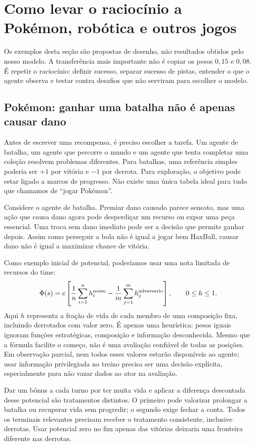 \documentclass[11pt,a4paper]{article}
\begin{document}
\section{Como levar o raciocínio a Pokémon, robótica e outros jogos}
Os exemplos desta seção são propostas de desenho, não resultados obtidos pelo nosso modelo. A transferência mais importante não é copiar os pesos $0{,}15$ e $0{,}08$. É repetir o raciocínio: definir sucesso, separar sucesso de pistas, entender o que o agente observa e testar contra desafios que não serviram para escolher o modelo.

\subsection{Pokémon: ganhar uma batalha não é apenas causar dano}
Antes de escrever uma recompensa, é preciso escolher a tarefa. Um agente de batalha, um agente que percorre o mundo e um agente que tenta completar uma coleção resolvem problemas diferentes. Para batalhas, uma referência simples poderia ser $+1$ por vitória e $-1$ por derrota. Para exploração, o objetivo pode estar ligado a marcos de progresso. Não existe uma única tabela ideal para tudo que chamamos de ``jogar Pokémon''.

Considere o agente de batalha. Premiar dano causado parece sensato, mas uma ação que causa dano agora pode desperdiçar um recurso ou expor uma peça essencial. Uma troca sem dano imediato pode ser a decisão que permite ganhar depois. Assim como perseguir a bola não é igual a jogar bem HaxBall, causar dano não é igual a maximizar chance de vitória.

Como exemplo inicial de potencial, poderíamos usar uma nota limitada de recursos do time:
\begin{equation}
 \Phi(s)=c\left[\frac{1}{n}\sum_{i=1}^{n}h_i^{\rm nosso}
 -\frac{1}{m}\sum_{j=1}^{m}h_j^{\rm adversario}\right],
 \qquad 0\leq h\leq1.
\end{equation}
Aqui $h$ representa a fração de vida de cada membro de uma composição fixa, incluindo derrotados com valor zero. É apenas uma heurística: pesos iguais ignoram funções estratégicas, composição e informação desconhecida. Mesmo que a fórmula facilite o começo, não é uma avaliação confiável de todas as posições. Em observação parcial, nem todos esses valores estarão disponíveis ao agente; usar informação privilegiada no treino precisa ser uma decisão explícita, especialmente para não vazar dados ao ator na avaliação.

Dar um bônus a cada turno por ter muita vida e aplicar a diferença descontada desse potencial são tratamentos distintos. O primeiro pode valorizar prolongar a batalha ou recuperar vida sem progredir; o segundo exige fechar a conta. Todos os terminais relevantes precisam receber o tratamento consistente, inclusive derrotas. Usar potencial zero no fim apenas das vitórias deixaria uma fronteira diferente nas derrotas.
\end{document}
